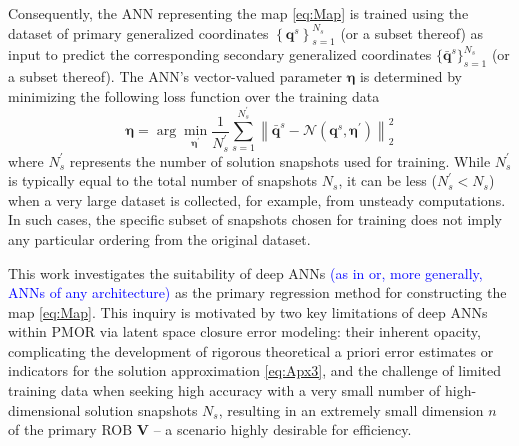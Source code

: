 \documentclass[preprint,10pt]{elsarticle}
\begin{document}
Consequently, the ANN representing the map \eqref{eq:Map} is trained using the dataset of primary generalized coordinates $\left\{\mathbf{q}^s\right\}_{s = 1}^{N_s}$ (or a subset 
thereof) as input to predict the corresponding secondary generalized coordinates $\{\bar{\mathbf{q}}^s\}_{s = 1}^{N_s}$ (or a subset thereof). The ANN's vector-valued parameter
$\boldsymbol{\eta}$ is determined by minimizing the following loss function over the training data
\begin{equation*}
\boldsymbol{\eta} = \arg \min_{\boldsymbol{\eta}^{\prime}} \displaystyle{\frac{1}{N_s^\prime} \sum_{s=1}^{N_s^\prime} \left\|\bar{\mathbf{q}}^s - \mathcal{N}\left(\mathbf{q}^s, 
	\boldsymbol{\eta}^\prime\right) \right\|_2^2}
\end{equation*}
where $N_s^\prime$ represents the number of solution snapshots used for training. While $N_s^\prime$ is typically equal to the total 
number of snapshots $N_s$, it can be less ($N_s^\prime < N_s$) when a very large dataset is collected, for example, from unsteady 
computations. In such cases, the specific subset of snapshots chosen for training does not imply any particular ordering from the 
original dataset.

This work investigates the suitability of deep ANNs \textcolor{blue}{(as in \cite{barnett2023neural} or, more generally, ANNs of any architecture)} as the primary regression method for constructing the map \eqref{eq:Map}. This inquiry is motivated by two key limitations of 
deep ANNs within PMOR via latent space closure error modeling: their inherent opacity, complicating the development of rigorous theoretical a priori error estimates or indicators 
for the solution approximation \eqref{eq:Apx3}, and the challenge of limited training data when seeking high accuracy with a very small number of high-dimensional solution snapshots 
$N_s$, resulting in an extremely small dimension $n$ of the primary ROB $\mathbf{V}$ -- a scenario highly desirable for efficiency.
\end{document}
